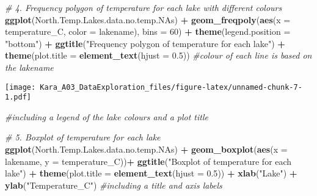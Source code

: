 \documentclass[]{article}
\newenvironment{Shaded}{\begin{snugshade}}{\end{snugshade}}
\newcommand{\KeywordTok}[1]{\textcolor[rgb]{0.13,0.29,0.53}{\textbf{#1}}}
\newcommand{\DataTypeTok}[1]{\textcolor[rgb]{0.13,0.29,0.53}{#1}}
\newcommand{\DecValTok}[1]{\textcolor[rgb]{0.00,0.00,0.81}{#1}}
\newcommand{\FloatTok}[1]{\textcolor[rgb]{0.00,0.00,0.81}{#1}}
\newcommand{\StringTok}[1]{\textcolor[rgb]{0.31,0.60,0.02}{#1}}
\newcommand{\CommentTok}[1]{\textcolor[rgb]{0.56,0.35,0.01}{\textit{#1}}}
\newcommand{\OperatorTok}[1]{\textcolor[rgb]{0.81,0.36,0.00}{\textbf{#1}}}
\newcommand{\NormalTok}[1]{#1}
\begin{document}
\begin{Shaded}
\begin{Highlighting}[]
\CommentTok{# 4. Frequency polygon of temperature for each lake with different colours}
\KeywordTok{ggplot}\NormalTok{(North.Temp.Lakes.data.no.temp.NAs) }\OperatorTok{+}
\StringTok{  }\KeywordTok{geom_freqpoly}\NormalTok{(}\KeywordTok{aes}\NormalTok{(}\DataTypeTok{x =}\NormalTok{ temperature_C, }\DataTypeTok{color =}\NormalTok{ lakename), }\DataTypeTok{bins =} \DecValTok{60}\NormalTok{) }\OperatorTok{+}\StringTok{ }
\StringTok{  }\KeywordTok{theme}\NormalTok{(}\DataTypeTok{legend.position =} \StringTok{"bottom"}\NormalTok{) }\OperatorTok{+}\StringTok{ }\KeywordTok{ggtitle}\NormalTok{(}\StringTok{"Frequency polygon of temperature for each lake"}\NormalTok{) }\OperatorTok{+}\StringTok{ }
\StringTok{  }\KeywordTok{theme}\NormalTok{(}\DataTypeTok{plot.title =} \KeywordTok{element_text}\NormalTok{(}\DataTypeTok{hjust =} \FloatTok{0.5}\NormalTok{)) }\CommentTok{#colour of each line is based on the lakename}
\end{Highlighting}
\end{Shaded}

\texttt{[image: Kara\_A03\_DataExploration\_files/figure-latex/unnamed-chunk-7-1.pdf]}

\begin{Shaded}
\begin{Highlighting}[]
\CommentTok{#including a legend of the lake colours and a plot title}
\end{Highlighting}
\end{Shaded}

\begin{Shaded}
\begin{Highlighting}[]
\CommentTok{# 5. Boxplot of temperature for each lake}
\KeywordTok{ggplot}\NormalTok{(North.Temp.Lakes.data.no.temp.NAs) }\OperatorTok{+}
\StringTok{  }\KeywordTok{geom_boxplot}\NormalTok{(}\KeywordTok{aes}\NormalTok{(}\DataTypeTok{x =}\NormalTok{ lakename, }\DataTypeTok{y =}\NormalTok{ temperature_C))}\OperatorTok{+}\StringTok{ }
\StringTok{  }\KeywordTok{ggtitle}\NormalTok{(}\StringTok{"Boxplot of temperature for each lake"}\NormalTok{) }\OperatorTok{+}\StringTok{ }\KeywordTok{theme}\NormalTok{(}\DataTypeTok{plot.title =} \KeywordTok{element_text}\NormalTok{(}\DataTypeTok{hjust =} \FloatTok{0.5}\NormalTok{)) }\OperatorTok{+}\StringTok{ }
\StringTok{  }\KeywordTok{xlab}\NormalTok{(}\StringTok{"Lake"}\NormalTok{) }\OperatorTok{+}\StringTok{ }\KeywordTok{ylab}\NormalTok{(}\StringTok{"Temperature_C"}\NormalTok{) }\CommentTok{#including a title and axis labels}
\end{Highlighting}
\end{Shaded}
\end{document}
